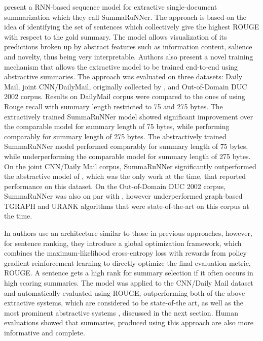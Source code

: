 \documentclass[11pt,a4paper,onecolumn]{article}
\begin{document}
\cite{nallapati2017summarunner} present a RNN-based sequence model for extractive single-document summarization  which they call SummaRuNNer.
The approach is based on the idea of identifying the set of sentences which collectively give the highest ROUGE with respect to the gold summary.
The model allows visualization of its predictions broken up by abstract features such as information content, salience and novelty, thus being very interpretable.
Authors also present a novel training mechanism that allows the extractive model to be trained end-to-end using abstractive summaries.
The approach was evaluated on three datasets: Daily Mail, joint CNN/DailyMail, originally collected by \cite{hermann2015teaching}, and Out-of-Domain DUC 2002 corpus.
Results on DailyMail corpus were compared to the ones of \cite{cheng2016neural} using Rouge recall with summary length restricted to 75 and 275 bytes.
The extractively trained SummaRuNNer model showed significant improvement over the comparable model for summary length of 75 bytes, while performing comparably for summary length of 275 bytes.
The abstractively trained SummaRuNNer model performed comparably for summary length of 75 bytes, while underperforming the comparable model for summary length of 275 bytes.
On the joint CNN/Daily Mail corpus, SummaRuNNer significantly outperformed the abstractive model of \cite{nallapati2016abstractive}, which was the only work at the time, that reported performance on this dataset.
On the Out-of-Domain DUC 2002 corpus, SummaRuNNer was also on par with \cite{cheng2016neural}, however underperformed graph-based TGRAPH \cite{parveen2015topical} and URANK \cite{wan2010towards} algorithms that were state-of-the-art on this corpus at the time.

In \cite{narayan2017neural} authors use an architecture similar to those in previous approaches, however, for sentence ranking, they introduce a global optimization framework, which combines the maximum-likelihood cross-entropy loss with rewards from policy gradient reinforcement learning to directly optimize the final evaluation metric, ROUGE.
A sentence gets a high rank for summary selection if it often occurs in high scoring summaries.
The model was applied to the CNN/Daily Mail dataset and automatically evaluated using ROUGE, outperforming both of the above extractive systems, which are considered to be state-of-the art, as well as the most prominent abstractive systems \cite{nallapati2016abstractive, chen2016distraction, see2017get}, discussed in the next section.
Human evaluations showed that summaries, produced using this approach are also more informative and complete.
\end{document}
